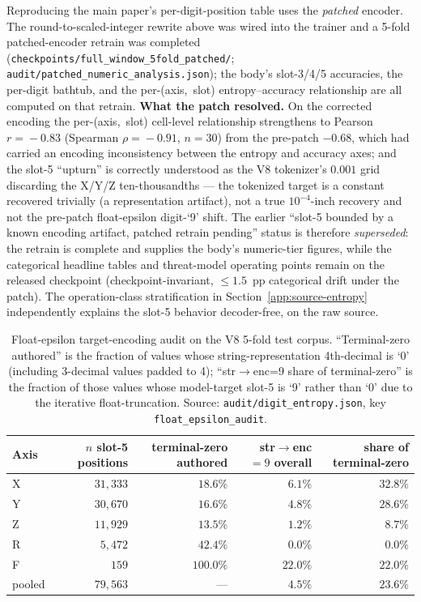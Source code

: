\documentclass[11pt,a4paper]{article}
\begin{document}
Reproducing the main paper's per-digit-position table uses the \emph{patched} encoder. The round-to-scaled-integer rewrite above was wired into the trainer and a 5-fold patched-encoder retrain was completed (\texttt{checkpoints/full\_window\_5fold\_patched/}; \texttt{audit/patched\_numeric\_analysis.json}); the body's slot-3/4/5 accuracies, the per-digit bathtub, and the per-(axis,~slot) entropy--accuracy relationship are all computed on that retrain. \textbf{What the patch resolved.} On the corrected encoding the per-(axis,~slot) cell-level relationship strengthens to Pearson $r\!=\!-0.83$ (Spearman $\rho\!=\!-0.91$, $n\!=\!30$) from the pre-patch $-0.68$, which had carried an encoding inconsistency between the entropy and accuracy axes; and the slot-5 ``upturn'' is correctly understood as the V8 tokenizer's $0.001$ grid discarding the X/Y/Z ten-thousandths --- the tokenized target is a constant recovered trivially (a representation artifact), not a true $10^{-4}$-inch recovery and not the pre-patch float-epsilon digit-`9' shift. The earlier ``slot-5 bounded by a known encoding artifact, patched retrain pending'' status is therefore \emph{superseded}: the retrain is complete and supplies the body's numeric-tier figures, while the categorical headline tables and threat-model operating points remain on the released checkpoint (checkpoint-invariant, $\le\!1.5$~pp categorical drift under the patch). The operation-class stratification in Section~\ref{app:source-entropy} independently explains the slot-5 behavior decoder-free, on the raw source.

\begin{table}[ht]
\centering
\caption{Float-epsilon target-encoding audit on the V8 5-fold test corpus. ``Terminal-zero authored'' is the fraction of values whose string-representation 4th-decimal is `0' (including 3-decimal values padded to 4); ``str$\to$enc=9 share of terminal-zero'' is the fraction of those values whose model-target slot-5 is `9' rather than `0' due to the iterative float-truncation. Source: \texttt{audit/digit\_entropy.json}, key \texttt{float\_epsilon\_audit}.}
\label{tab:float_epsilon_audit}
\begin{tabular}{l r r r r}
\toprule
Axis & $n$ slot-5 positions & terminal-zero authored & str$\to$enc$\!=\!9$ overall & share of terminal-zero \\
\midrule
X       & $31{,}333$ & $18.6\%$ & $\phantom{0}6.1\%$ & $\mathbf{32.8\%}$ \\
Y       & $30{,}670$ & $16.6\%$ & $\phantom{0}4.8\%$ & $28.6\%$ \\
Z       & $11{,}929$ & $13.5\%$ & $\phantom{0}1.2\%$ & $\phantom{0}8.7\%$ \\
R       & $\phantom{0}5{,}472$ & $42.4\%$ & $\phantom{0}0.0\%$ & $\phantom{0}0.0\%$ \\
F       & $\phantom{00,}159$ & $100.0\%$ & $22.0\%$ & $22.0\%$ \\
\midrule
pooled  & $79{,}563$ & --- & $\phantom{0}4.5\%$ & $\mathbf{23.6\%}$ \\
\bottomrule
\end{tabular}
\end{table}
\end{document}

